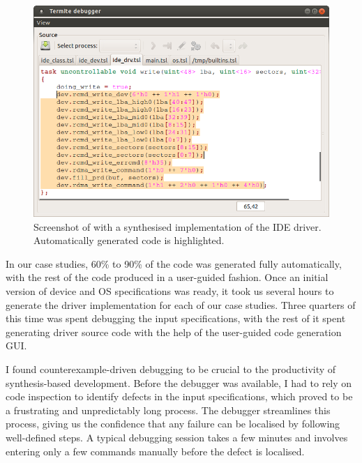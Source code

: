 \begin{figure}
    \center
    \includegraphics[width=\linewidth]{imgs/screenshot_write.png}
    \caption{Screenshot of \termite with a synthesised implementation of the IDE driver.  Automatically generated code is highlighted.}
    \label{f:screenshot_write}
\end{figure}

In our case studies, 60\% to 90\% of the code was generated fully automatically, with the rest of the code produced in a user-guided fashion.  Once an initial version of device and OS specifications was ready, it took us several hours to generate the driver implementation for each of our case studies.  Three quarters of this time was spent debugging the input specifications, with the rest of it spent generating driver source code with the help of the user-guided code generation GUI.

I found counterexample-driven debugging to be crucial to the productivity of synthesis-based development.  Before the debugger was available, I had to rely on code inspection to identify defects in the input specifications, which proved to be a frustrating and unpredictably long process.  The \termite debugger streamlines this process, giving us the confidence that any failure can be localised by following well-defined steps.  A typical debugging session takes a few minutes and involves entering only a few commands manually before the defect is localised. 

%
%
%

